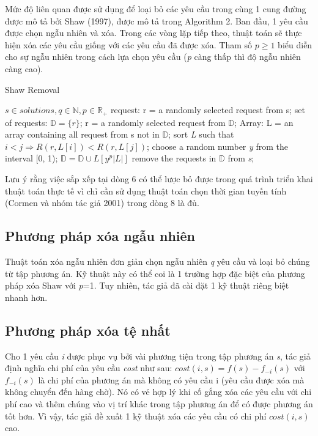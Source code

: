 Mức độ liên quan được sử dụng để loại bỏ các yêu cầu trong cùng 1 cung đường được mô tả bởi Shaw (1997), được mô tả trong Algorithm 2. Ban đầu, 1 yêu cầu được chọn ngẫu nhiên và xóa. Trong các vòng lặp tiếp theo, thuật toán sẽ thực hiện xóa các yêu cầu giống với các yêu cầu đã được xóa. Tham số $p \geqslant 1$ biểu diễn cho sự ngẫu nhiên trong cách lựa chọn yêu cầu (\textit{p} càng thấp thì độ ngẫu nhiên càng cao).

\begin{algorithm}
	\caption{Shaw Removal} 
	\begin{algorithmic}[1]
        \Require $s \in {solutions}, q \in \mathbb{N}, p \in \mathbb{R}_{+}$
        \State request: r = a randomly selected request from s;
        \State set of requests: $\mathbb{D}=\{r\}$;
		  \State r = a randomly selected request from $\mathbb{D}$;
            \State Array: L = an array containing all request from s not in $\mathbb{D}$;
            \State sort \textit{L} such that $i<j \Rightarrow R(r, L\left[ i \right]) < R(r, L\left[ j \right])$;
            \State choose a random number \textit{y} from the interval [0, 1);
            \State $\mathbb{D}=\mathbb{D}\cup {L \left[ y^p|L| \right]}$
        \EndWhile
    \State remove the requests in $\mathbb{D}$ from \textit{s};
	\end{algorithmic} 
\end{algorithm}

Lưu ý rằng việc sắp xếp tại dòng 6 có thể lược bỏ được trong quá trình triển khai thuật toán thực tế vì chỉ cần sử dụng thuật toán chọn thời gian tuyến tính (Cormen và nhóm tác giả 2001) trong dòng 8 là đủ.

\subsection{Phương pháp xóa ngẫu nhiên}
Thuật toán xóa ngẫu nhiên đơn giản chọn ngẫu nhiên \textit{q} yêu cầu và loại bỏ chúng từ tập phương án. Kỹ thuật này có thể coi là 1 trường hợp đặc biệt của phương pháp xóa Shaw với \textit{p}=1. Tuy nhiên, tác giả đã cài đặt 1 kỹ thuật riêng biệt nhanh hơn.

\subsection{Phương pháp xóa tệ nhất}
Cho 1 yêu cầu \textit{i} được phục vụ bởi vài phương tiện trong tập phương án \textit{s}, tác giả định nghĩa chi phí của yêu cầu \textit{cost} như sau: $cost(i,s)=f(s)-f_{-i}(s)$ với $f_{-i}(s)$ là chi phí của phương án mà không có yêu cầu i (yêu cầu được xóa mà không chuyển đến hàng chờ). Nó có vẻ hợp lý khi cố gắng xóa các yêu cầu với chi phí cao và thêm chúng vào vị trí khác trong tập phương án để có được phương án tốt hơn. Vì vậy, tác giả đề xuất 1 kỹ thuật xóa các yêu cầu có chi phí $cost(i, s)$ cao.


